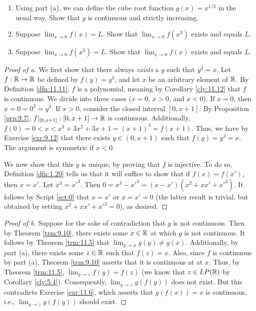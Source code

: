 \documentclass[../main.tex]{subfiles}
\begin{document}
\begin{enumerate}
\begin{enumerate}
        \item Using part (a), we can define the cube root function $g(x)=x^{1/3}$ in the usual way. Show that $g$ is continuous and strictly increasing.
        \item Suppose $\lim_{x\to 0}f(x)=L$. Show that $\lim_{x\to 0}f(x^3)$ exists and equals $L$.
        \item Suppose $\lim_{x\to 0}f(x^3)=L$. Show that $\lim_{x\to 0}f(x)$ exists and equals $L$.
    \end{enumerate}
    \begin{proof}[Proof of a]
        We first show that there always \emph{exists} a $y$ such that $y^3=x$. Let $f:\mathbb{R}\to\mathbb{R}$ be defined by $f(y)=y^3$, and let $x$ be an arbitrary element of $\mathbb{R}$. By Definition \ref{dfn:11.11}, $f$ is a polynomial, meaning by Corollary \ref{cly:11.12} that $f$ is continuous. We divide into three cases ($x=0$, $x>0$, and $x<0$). If $x=0$, then $x=0=0^3=y^3$. If $x>0$, consider the closed interval $[0,x+1]$. By Proposition \ref{prp:9.7}, $f|_{[0,x+1]}:[0,x+1]\to\mathbb{R}$ is continuous. Additionally, $f(0)=0<x<x^3+3x^2+3x+1=(x+1)^3=f(x+1)$. Thus, we have by Exercise \ref{exr:9.12} that there exists $y\in(0,x+1)$ such that $f(y)=y^3=x$. The argument is symmetric if $x<0$.\par
        We now show that this $y$ is unique, by proving that $f$ is injective. To do so, Definition \ref{dfn:1.20} tells us that it will suffice to show that if $f(x)=f(x')$, then $x=x'$. Let $x^3=x'^3$. Then $0=x^3-x'^3=(x-x')(x^2+xx'+x'^2)$. It follows by Script \ref{sct:0} that $x=x'$ or $x=x'=0$ (the latter result is trivial, but obtained by setting $x^2+xx'+x'^2=0$), as desired.
    \end{proof}
    \begin{proof}[Proof of b]
        Suppose for the sake of contradiction that $g$ is not continuous. Then by Theorem \ref{trm:9.10}, there exists some $x\in\mathbb{R}$ at which $g$ is not continuous. It follows by Theorem \ref{trm:11.5} that $\lim_{y\to x}g(y)\neq g(x)$. Additionally, by part (a), there exists some $z\in\mathbb{R}$ such that $f(z)=x$. Also, since $f$ is continuous by part (a), Theorem \ref{trm:9.10} asserts that it is continuous at at $x$. Thus, by Theorem \ref{trm:11.5}, $\lim_{y\to z}f(y)=f(z)$ (we know that $z\in LP(\mathbb{R})$ by Corollary \ref{cly:5.4}). Consequently, $\lim_{y\to z}g(f(y))$ does not exist. But this contradicts Exercise \ref{exr:11.6}, which asserts that $g(f(x))=x$ is continuous, i.e., $\lim_{y\to z}g(f(y))$ should exist.\par

\end{proof}
\end{enumerate}
\end{document}
